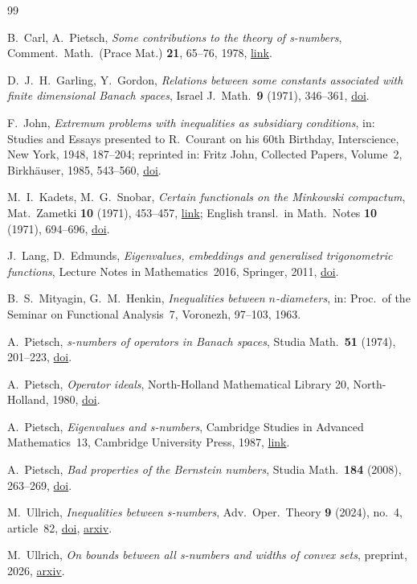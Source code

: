 \bpbibheading
\begin{thebibliography}{99}

B.~Carl, A.~Pietsch,
\emph{Some contributions to the theory of s-numbers},
Comment.\ Math.\ (Prace Mat.) \textbf{21}, 65--76, 1978,
\href{https://zbmath.org/3624284}{link}.

D.~J.~H.~Garling, Y.~Gordon,
\emph{Relations between some constants associated with finite dimensional
Banach spaces},
Israel J.\ Math.\ \textbf{9} (1971), 346--361,
\href{https://doi.org/10.1007/BF02771685}{doi}.

F.~John,
\emph{Extremum problems with inequalities as subsidiary conditions},
in: Studies and Essays presented to R.~Courant on his 60th Birthday,
Interscience, New York, 1948, 187--204;
reprinted in: Fritz John, Collected Papers, Volume~2, Birkh\"auser, 1985,
543--560, \href{https://doi.org/10.1007/978-1-4612-5412-6_25}{doi}.

M.~I.~Kadets, M.~G.~Snobar,
\emph{Certain functionals on the Minkowski compactum},
Mat.\ Zametki \textbf{10} (1971), 453--457,
\href{https://www.mathnet.ru/eng/mzm9734}{link};
English transl.\ in Math.\ Notes \textbf{10} (1971), 694--696,
\href{https://doi.org/10.1007/BF01106467}{doi}.

J.~Lang, D.~Edmunds,
\emph{Eigenvalues, embeddings and generalised trigonometric functions},
Lecture Notes in Mathematics~2016, Springer, 2011,
\href{https://doi.org/10.1007/978-3-642-18429-1}{doi}.

B.~S.~Mityagin, G.~M.~Henkin,
\emph{Inequalities between $n$-diameters},
in: Proc.\ of the Seminar on Functional Analysis~7, Voronezh, 97--103, 1963.

A.~Pietsch,
\emph{s-numbers of operators in Banach spaces},
Studia Math.\ \textbf{51} (1974), 201--223,
\href{https://doi.org/10.4064/sm-51-3-201-223}{doi}.

A.~Pietsch,
\emph{Operator ideals},
North-Holland Mathematical Library 20, North-Holland, 1980,
\href{https://doi.org/10.1016/S0924-6509(09)X7001-7}{doi}.

A.~Pietsch,
\emph{Eigenvalues and s-numbers},
Cambridge Studies in Advanced Mathematics~13, Cambridge University Press, 1987,
\href{https://zbmath.org/3996455}{link}.

A.~Pietsch,
\emph{Bad properties of the Bernstein numbers},
Studia Math.\ \textbf{184} (2008), 263--269,
\href{https://doi.org/10.4064/sm184-3-5}{doi}.

M.~Ullrich,
\emph{Inequalities between s-numbers},
Adv.\ Oper.\ Theory \textbf{9} (2024), no.~4, article~82,
\href{https://doi.org/10.1007/s43036-024-00386-x}{doi},
\href{https://arxiv.org/abs/2405.05509}{arxiv}.

M.~Ullrich,
\emph{On bounds between all s-numbers and widths of convex sets},
preprint, 2026,
\href{https://arxiv.org/abs/2608.05024}{arxiv}.

\end{thebibliography}
